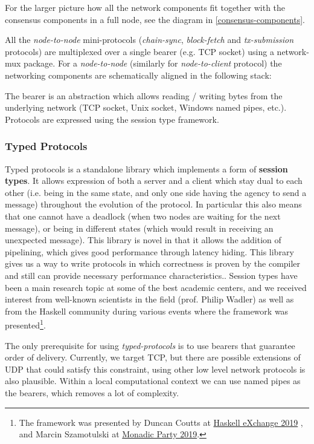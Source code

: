 \documentclass[11pt,a4paper]{article}
\begin{document}
For the larger picture how all the network components fit together with
the consensus components in a full node, see the diagram in
\cref{consensus-components}.

All the \emph{node-to-node} mini-protocols (\emph{chain-sync},
\emph{block-fetch} and \emph{tx-submission} protocols) are multiplexed
over a single bearer (e.g. TCP socket) using a network-mux package. For
a \emph{node-to-node} (similarly for \emph{node-to-client} protocol) the
networking components are schematically aligned in the following stack:

The bearer is an abstraction which allows reading / writing bytes from
the underlying network (TCP socket, Unix socket, Windows named pipes,
etc.). Protocols are expressed using the session type framework.

\subsubsection{Typed Protocols}
\label{typed-protocols}

Typed protocols is a standalone library which implements a form of
\textbf{session types}. It allows expression of both a server and a
client which stay dual to each other (i.e. being in the same state, and
only one side having the agency to send a message) throughout the
evolution of the protocol. In particular this also means that one cannot
have a deadlock (when two nodes are waiting for the next message), or
being in different states (which would result in receiving an unexpected
message). This library is novel in that it allows the addition of
pipelining, which gives good performance through latency hiding. This
library gives us a way to write protocols in which correctness is proven
by the compiler and still can provide necessary performance
characteristics.. Session types have been a main research topic at some
of the best academic centers, and we received interest from well-known
scientists in the field (prof. Philip Wadler) as well as from the
Haskell community during various events where the framework was
presented\footnote{The framework was presented by Duncan Coutts at
  \href{https://skillsmatter.com/skillscasts/14633-45-minute-talk-by-duncan-coutts}{{Haskell
  eXchange 2019}} , and Marcin Szamotulski at
  \href{https://www.youtube.com/watch?v=j8gza2L61nM}{{Monadic Party
  2019}}.}.

The only prerequisite for using \emph{typed-protocols} is to use bearers
that guarantee order of delivery. Currently, we target TCP, but there
are possible extensions of UDP that could satisfy this constraint, using
other low level network protocols is also plausible. Within a local
computational context we can use named pipes as the bearers, which
removes a lot of complexity.
\end{document}
